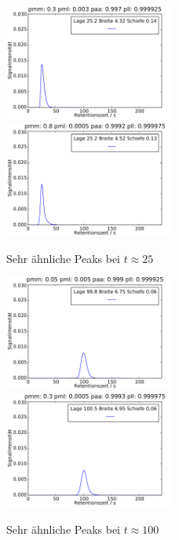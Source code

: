 \begin{figure}[h]
\includegraphics[width=0.5\textwidth]{bilder/kombis/1peak1_kombi1}
\includegraphics[width=0.5\textwidth]{bilder/kombis/1peak1_kombi2}
\caption{Sehr ähnliche Peaks bei $t \approx 25$}
\label{2kombis_1}
\end{figure}

\begin{figure}[h]
\includegraphics[width=0.5\textwidth]{bilder/kombis/1peak2_kombi1}
\includegraphics[width=0.5\textwidth]{bilder/kombis/1peak2_kombi2}
\caption{Sehr ähnliche Peaks bei $t \approx 100$}
\label{2kombis_2}
\end{figure}


